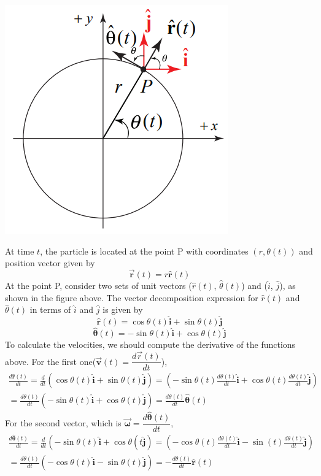 \documentclass[12pt,addpoints]{exam}
\begin{document}
	\begin{center}
		\includegraphics[scale=0.4]{circ.png}
	\end{center}
	At time $t$, the particle is located at the point P with coordinates  $(r,\theta(t))$ and position vector given by
	$$\overrightarrow{\mathbf{r}}(t)=r \hat{\mathbf{r}}(t)$$
	At the point P, consider two sets of unit vectors ($\hat{r}(t)$, $\hat{\theta}(t)$) and ($\hat{i}$, $\hat{j}$), as shown in the figure above. The vector decomposition expression for $\hat{r}(t)$ and $\hat{\theta}(t)$ in terms of $\hat{i}$ and $\hat{j}$ is given by
	$$\hat{\mathbf{r}}(t)=\cos \theta(t) \hat{\mathbf{i}}+\sin \theta(t) \hat{\mathbf{j}}$$
	$$\hat{\boldsymbol{\theta}}(t)=-\sin \theta(t) \hat{\mathbf{i}}+\cos \theta(t) \hat{\mathbf{j}}$$
	To calculate the velocities, we should compute the derivative of the functions above. For the first one($\vec{\mathbf{v}}(t)=\dfrac{d\vec{r}(t)}{dt}$),
	$$\begin{array}{l} 
		\frac{d \hat{\mathbf{r}}(t)}{d t}=\frac{d}{d t}(\cos \theta(t) \hat{\mathbf{i}}+\sin \theta(t) \hat{\mathbf{j}})=\left(-\sin \theta(t) \frac{d \theta(t)}{d t} \hat{\mathbf{i}}+\cos \theta(t) \frac{d \theta(t)}{d t} \hat{\mathbf{j}}\right) \\ 
		=\frac{d \theta(t)}{d t}(-\sin \theta(t) \hat{\mathbf{i}}+\cos \theta(t) \hat{\mathbf{j}})=\frac{d \theta(t)}{d t} \hat{\mathbf{\theta}}(t) 
	\end{array} \nonumber$$
	For the second vector, which is $\vec{\boldsymbol{\omega}}=\dfrac{d\hat{\boldsymbol{\theta}}(t)}{dt}$,
	$$\begin{array}{l} 
		\frac{d \hat{\boldsymbol{\theta}}(t)}{d t}=\frac{d}{d t}\left(-\sin \theta(t) \hat{\mathbf{i}}+\cos \theta(t \hat{\mathbf{j}})=\left(-\cos \theta(t) \frac{d \theta(t)}{d t} \hat{\mathbf{i}}-\sin (t) \frac{d \theta(t)}{d t} \hat{\mathbf{j}}\right)\right. \\ 
		=\frac{d \theta(t)}{d t}(-\cos \theta(t) \hat{\mathbf{i}}-\sin \theta(t) \hat{\mathbf{j}})=-\frac{d \theta(t)}{d t} \hat{\mathbf{r}}(t) 
	\end{array} \nonumber$$
\end{document}
